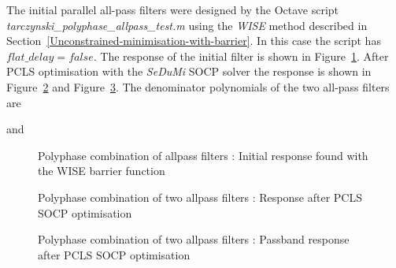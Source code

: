 \documentclass[a4paper,twoside,10pt,english]{report}
\begin{document}
The initial parallel all-pass filters were designed by the
Octave script \emph{tarczynski\_polyphase\_allpass\_test.m} using the \emph{WISE}
method described in Section~\ref{Unconstrained-minimisation-with-barrier}. In
this case the script has $flat\_delay = false$. The response of the initial 
filter is shown in Figure~\ref{fig:Polyphase-allpass-filter-initial-response}.
After PCLS optimisation with the \emph{SeDuMi} SOCP solver the response is 
shown in Figure~\ref{fig:Polyphase-allpass-filter-PCLS-SOCP-response} and
Figure~\ref{fig:Polyphase-allpass-filter-PCLS-SOCP-passband-response}. The
denominator polynomials of the two all-pass filters are
\begin{small}

\end{small}
and
\begin{small}

\end{small}
\begin{figure}[!htbp]
\begin{center}
\scalebox{0.7}{}
\caption{Polyphase combination of allpass filters : Initial response found
with the WISE barrier function}
\label{fig:Polyphase-allpass-filter-initial-response}
\end{center}
\end{figure}
\begin{figure}[!htbp]
\begin{center}
\scalebox{0.7}{}
\caption{Polyphase combination of two allpass filters : Response after PCLS SOCP optimisation}
\label{fig:Polyphase-allpass-filter-PCLS-SOCP-response}
\end{center}
\end{figure}
\begin{figure}[!htbp]
\begin{center}
\scalebox{0.7}{}
\caption{Polyphase combination of two allpass filters : Passband response after PCLS SOCP optimisation}
\label{fig:Polyphase-allpass-filter-PCLS-SOCP-passband-response}
\end{center}
\end{figure}
\clearpage
\end{document}
